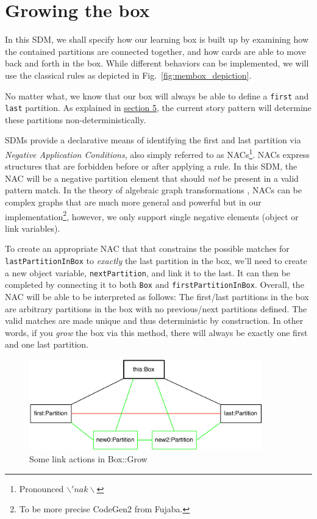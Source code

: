 \newpage
\section{Growing the box}
\genHeader
\hypertarget{sec:growBox}{}

In this SDM, we shall specify how our learning box is built up by examining how the contained partitions are connected together, and how cards are able to
move back and forth in the box. While different behaviors can be implemented, we will use the classical rules as depicted in Fig.~\ref{fig:membox_depiction}.

No matter what, we know that our box will always be able to define a \texttt{first} and \texttt{last} partition. As explained in
\hyperlink{sec:emptyPartition}{section 5}, the current story pattern will determine these partitions non-deterministically.

SDMs provide a declarative means of identifying the first and last partition via \emph{Negative Application Conditions}, also simply referred to as
\mbox{NACs}\footnote{Pronounced $\backslash 'nak \backslash$}. \mbox{NAC}s express structures that are forbidden before or after applying a
rule. In this SDM, the \mbox{NAC} will be a negative partition element that should \emph{not} be present in a valid pattern match. In the theory of algebraic
graph transformations \cite{EEPT06}, \mbox{NACs} can be complex graphs that are much more general and powerful but in our implementation\footnote{To be more
precise CodeGen2 from Fujaba.}, however, we only support single negative elements (object or link variables).

To create an appropriate \mbox{NAC} that that constrains the possible matches for \texttt{lastPartitionInBox} to \emph{exactly} the last partition in the box,
we'll need to create a new object variable, \texttt{nextPartition}, and link it to the last. It can then be completed by connecting it to both \texttt{Box} and
\texttt{firstPartitionInBox}. Overall, the NAC will be able to be interpreted as follows:
The first/last partitions in the box are arbitrary partitions in the box with no previous/next partitions defined. The valid matches are made unique and thus
deterministic by construction. In other words, if you \emph{grow} the box via this method, there will always be exactly one first and one last partition.

\begin{figure}[htbp]
 	\centering
  \includegraphics[width=0.9\textwidth]{growBox.pdf}
	\caption{Some link actions in Box::Grow}
	\label{fig:goal_grow}
\end{figure}
\FloatBarrier

